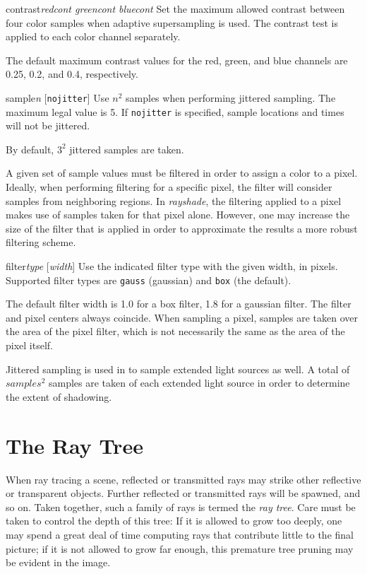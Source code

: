\begin{defkey}{contrast}{{\em redcont greencont bluecont}}
	Set the maximum allowed contrast between four color
	samples when adaptive supersampling is used.
	The contrast test is applied to each color
	channel separately.
\end{defkey}
The default maximum contrast values for the red, green, and blue
channels are 0.25, 0.2, and 0.4, respectively.

\begin{defkey}{sample}{{\em n} [{\tt nojitter}]}
	Use $n^{2} $ samples when performing jittered
	sampling.  The maximum legal value is 5.
	If {\tt nojitter} is specified, sample locations
	and times will not be jittered.
\end{defkey}
By default, $3^{2}$ jittered samples are taken.

A given set of sample values must be filtered
in order to
assign a color to a pixel.  Ideally, when performing filtering
for a specific pixel,
the filter will consider samples from neighboring regions.  In
{\em rayshade}, the filtering applied to a pixel makes use of samples
taken for that pixel alone.  However, one may increase the size
of the filter that is applied in order to approximate the results
a more robust filtering scheme.

\begin{defkey}{filter}{{\em type} [{\em width}]}
	Use the indicated filter type with the given width,
	in pixels.
	Supported filter types are {\tt gauss} (gaussian)
	and {\tt box} (the default).
\end{defkey}
The default filter width is 1.0 for a box filter, 1.8 for a gaussian
filter.  The filter and pixel centers always coincide.
When sampling a pixel, samples are taken over the area of
the pixel filter, which is not necessarily the same as the area
of the pixel itself.

Jittered sampling is used in \rayshade to sample extended light
sources as well.  A total of $samples^2$ samples are taken of
each extended light source in order to determine the extent of shadowing.

\section{The Ray Tree}

When ray tracing a scene, reflected or transmitted rays may strike
other reflective or transparent objects.  Further reflected or
transmitted rays will be spawned, and so on.  Taken together, such
a family of rays is termed the {\em ray tree}.  Care must be taken
to control the depth of this tree:  If it is allowed to grow too deeply,
one may spend a great deal of time computing rays that contribute little
to the final picture; if it is not allowed to grow far enough, this
premature tree pruning may be evident in the image.

